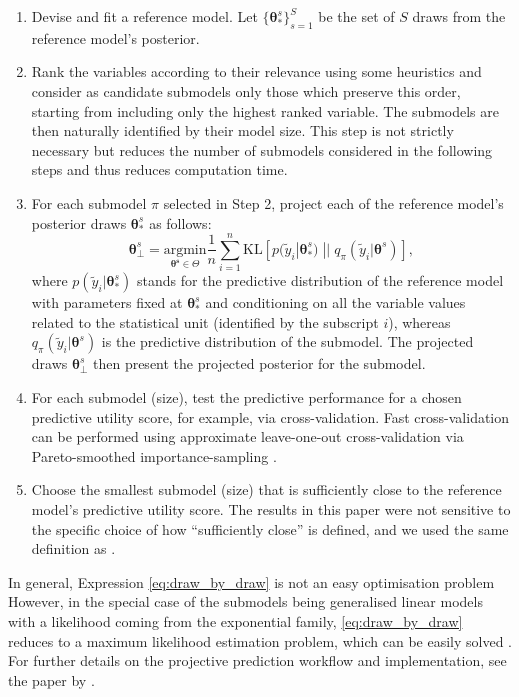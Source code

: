 \documentclass[a4]{article}
\theoremstyle{definition}
\begin{document}
\begin{enumerate}
\item Devise and fit a reference model. Let $\{\boldsymbol{\theta}_{*}^{s}\}_{s=1}^{S}$ be the set of $S$ draws from the reference model's posterior.
\item Rank the variables according to their relevance using some
  heuristics and consider as candidate submodels only those which
  preserve this order, starting from including only the highest ranked
  variable. The submodels are then naturally identified by their
  model size. This step is not strictly necessary but reduces the number
  of submodels considered in the following steps and thus reduces computation time.
\item For each submodel $\pi$ selected in Step 2, project each of the reference model's posterior draws $\boldsymbol{\theta}_{*}^{s}$ as follows:
\begin{equation}\label{eq:draw_by_draw}
\boldsymbol{\theta}_{\perp}^{s} = \underset{\boldsymbol{\theta^{s}}\in\Theta}{\text{argmin}} \frac{1}{n}\sum_{i=1}^{n}\text{KL} \left[ p(\tilde{y}_{i}|\boldsymbol{\theta}_{*}^{s})\;||\;q_\pi(\tilde{y}_{i}|\boldsymbol{\theta}^{s}) \right],
\end{equation}
where $p(\tilde{y}_{i}|\boldsymbol{\theta}_{*}^{s})$ stands for the
predictive distribution of the reference model with parameters fixed
at $\boldsymbol{\theta}_{*}^{s}$ and conditioning on all the variable
values related to the statistical unit (identified by the subscript
$i$), whereas $q_\pi(\tilde{y}_{i}|\boldsymbol{\theta}^{s})$ is the
predictive distribution of the submodel. The projected draws
$\boldsymbol{\theta}_{\perp}^{s}$ then present the projected posterior
for the submodel.
\item For each submodel (size), test the predictive performance for a chosen predictive utility score, for example, via cross-validation. Fast cross-validation can be performed using approximate leave-one-out cross-validation via Pareto-smoothed importance-sampling
\citep[PSIS-LOO-CV; ][]{paper:psis_loo}.
\item Choose the smallest submodel (size) that is sufficiently close to the reference model's predictive utility score. The results in this paper were not sensitive to the specific choice of how ``sufficiently close'' is defined, and we used the same definition as \citet{paper:projpred}.
\end{enumerate} 

In general, Expression \eqref{eq:draw_by_draw} is not an easy optimisation problem
However, in the special case of the submodels being
generalised linear models with a likelihood coming from the exponential family, \eqref{eq:draw_by_draw} reduces to a
maximum likelihood estimation problem, which can be easily solved
\citep{paper:original_proj}. For further details on the projective
prediction workflow and implementation, see the paper by \citet{paper:projpred}.
\end{document}
